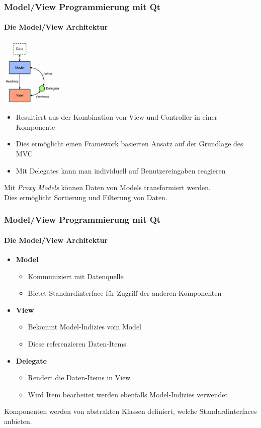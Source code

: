 \begin{frame}
	\frametitle{Model/View Programmierung mit Qt}
	\framesubtitle{Die Model/View Architektur}
	\begin{center}
		\includegraphics[width=3cm]{../mvc/modelview-overview.png}
	\end{center}
	\begin{itemize}
		\item Resultiert aus der Kombination von View und Controller in einer Komponente
		\item Dies ermöglicht einen Framework basierten Ansatz auf der Grundlage des MVC
		\item Mit Delegates kann man individuell auf Benutzereingaben reagieren
	\end{itemize}
	\begin{center}
		{\small Mit {\itshape Proxy Models} können Daten von Models transformiert werden.\\
		Dies ermöglicht Sortierung und Filterung von Daten.}
	\end{center}
\end{frame}

\begin{frame}
	\frametitle{Model/View Programmierung mit Qt}
	\framesubtitle{Die Model/View Architektur}
	\begin{itemize}
		\item {\bf Model}
		\begin{itemize}
			\item Kommuniziert mit Datenquelle
			\item Bietet Standardinterface für Zugriff der anderen Komponenten
		\end{itemize}
		\item {\bf View}
		\begin{itemize}
			\item Bekommt Model-Indizies vom Model
			\item Diese referenzieren Daten-Items
		\end{itemize}
		\item {\bf Delegate}
		\begin{itemize}
			\item Rendert die Daten-Items in View
			\item Wird Item bearbeitet werden ebenfalls Model-Indizies verwendet
		\end{itemize} 
	\end{itemize}
	\begin{center}
		Komponenten werden von abstrakten Klassen definiert, welche Standardinterfaces anbieten.
	\end{center}
\end{frame}

